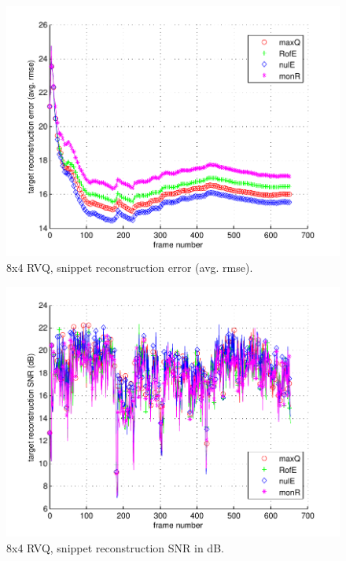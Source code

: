 								\begin{figure}[h!]
								\centering
								\includegraphics[height=0.4\textheight]{thesis/6_car4_8_4_1000_snp_armse.pdf}
								\caption{8x4 RVQ, snippet reconstruction error (avg. rmse).}
								\label{fig:6_car4_8_4_1000_snp_armse}
								\end{figure}

								\begin{figure}[h!]
								\centering
								\includegraphics[height=0.4\textheight]{thesis/6_car4_8_4_1000_snp_SNRdB.pdf}
								\caption{8x4 RVQ, snippet reconstruction SNR in dB.}
								\label{fig:6_car4_8_4_1000_snp_SNRdB}
								\end{figure}
\clearpage
\newpage
